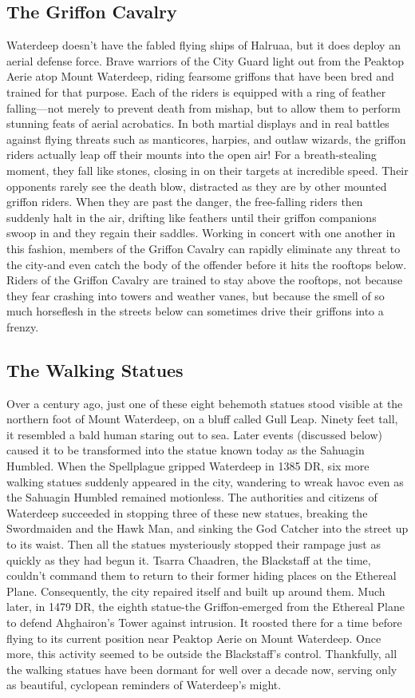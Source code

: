 \documentclass[10pt,a4paper,twoside,twocolumn,openany,nodeprecatedcode]{dndbook}
\begin{document}
\subsection{The Griffon Cavalry}
Waterdeep doesn't have the fabled flying ships of Halruaa, but it does deploy an aerial defense force. Brave warriors of the City Guard light out from the Peaktop Aerie atop Mount Waterdeep, riding fearsome griffons that have been bred and trained for that purpose. Each of the riders is equipped with a ring of feather falling—not merely to prevent death from mishap, but to allow them to perform stunning feats of aerial acrobatics.
In both martial displays and in real battles against flying threats such as manticores, harpies, and outlaw wizards, the griffon riders actually leap off their mounts into the open air! For a breath-stealing moment, they fall like stones, closing in on their targets at incredible speed. Their opponents rarely see the death blow, distracted as they are by other mounted griffon riders. When they are past the danger, the free-falling riders then suddenly halt in the air, drifting like feathers until their griffon companions swoop in and they regain their saddles. Working in concert with one another in this fashion, members of the Griffon Cavalry can rapidly eliminate any threat to the city-and even catch the body of the offender before it hits the rooftops below.
Riders of the Griffon Cavalry are trained to stay above the rooftops, not because they fear crashing into towers and weather vanes, but because the smell of so much horseflesh in the streets below can sometimes drive their griffons into a frenzy.
\subsection{The Walking Statues}
Over a century ago, just one of these eight behemoth statues stood visible at the northern foot of Mount Waterdeep, on a bluff called Gull Leap. Ninety feet tall, it resembled a bald human staring out to sea. Later events (discussed below) caused it to be transformed into the statue known today as the Sahuagin Humbled.
When the Spellplague gripped Waterdeep in 1385 DR, six more walking statues suddenly appeared in the city, wandering to wreak havoc even as the Sahuagin Humbled remained motionless. The authorities and citizens of Waterdeep succeeded in stopping three of these new statues, breaking the Swordmaiden and the Hawk Man, and sinking the God Catcher into the street up to its waist. Then all the statues mysteriously stopped their rampage just as quickly as they had begun it. Tsarra Chaadren, the Blackstaff at the time, couldn't command them to return to their former hiding places on the Ethereal Plane. Consequently, the city repaired itself and built up around them. Much later, in 1479 DR, the eighth statue-the Griffon-emerged from the Ethereal Plane to defend Ahghairon's Tower against intrusion. It roosted there for a time before flying to its current position near Peaktop Aerie on Mount Waterdeep. Once more, this activity seemed to be outside the Blackstaff's control. Thankfully, all the walking statues have been dormant for well over a decade now, serving only as beautiful, cyclopean reminders of Waterdeep's might.
\end{document}
